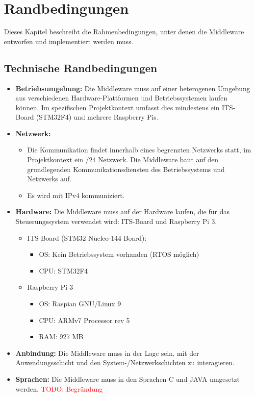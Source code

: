 

\chapter{Randbedingungen}

Dieses Kapitel beschreibt die Rahmenbedingungen, unter denen die Middleware entworfen und implementiert werden muss.

\section{Technische Randbedingungen}


\begin{itemize}
    \item \textbf{Betriebsumgebung:}  Die Middleware muss auf einer heterogenen Umgebung aus verschiedenen Hardware-Plattformen und Betriebssystemen laufen können. Im spezifischen Projektkontext umfasst dies mindestens ein ITS-Board (STM32F4) und mehrere Raspberry Pis.
    
    \item \textbf{Netzwerk:}  
    \begin{itemize}
        \item Die Kommunikation findet innerhalb eines begrenzten Netzwerks statt, im Projektkontext ein /24 Netzwerk. Die Middleware baut auf den grundlegenden Kommunikationsdiensten des Betriebssystems und Netzwerks auf.
        \item Es wird mit IPv4 kommuniziert.
    \end{itemize}
    \item \textbf{Hardware:} Die Middleware muss auf der Hardware laufen, die für das Steuerungssystem verwendet wird: ITS-Board und Raspberry Pi 3. 
    \begin{itemize}
    	\item ITS-Board (STM32 Nucleo-144 Board): 
    	\begin{itemize}
    		\item OS: Kein Betriebssystem vorhanden (RTOS möglich)
    		\item CPU: STM32F4
    		
    	\end{itemize}
    	\item Raspberry Pi 3
    	\begin{itemize}
    		\item OS: Raspian GNU/Linux 9
    		\item CPU: ARMv7 Processor rev 5
    		\item RAM: 927 MB
    		
    	\end{itemize}
    \end{itemize}
    \item \textbf{Anbindung:} Die Middleware muss in der Lage sein, mit der Anwendungsschicht und den System-/Netzwerkschichten zu interagieren.
    \item \textbf{Sprachen:} Die Middleware muss in den Sprachen C und JAVA umgesetzt werden. \textcolor{red}{TODO: Begründung}

    
\end{itemize}

